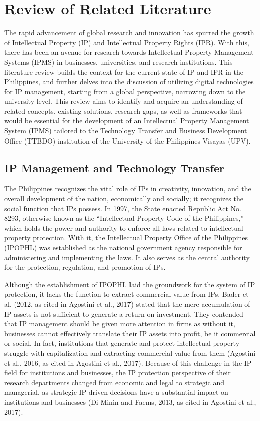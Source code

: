 \chapter{Review of Related Literature}

The rapid advancement of global research and innovation has spurred the growth of Intellectual Property (IP) and Intellectual Property Rights (IPR). With this, there has been an avenue for research towards Intellectual Property Management Systems (IPMS) in businesses, universities, and research institutions. This literature review builds the context for the current state of IP and IPR in the Philippines, and further delves into the discussion of utilizing digital technologies for IP management, starting from a global perspective, narrowing down to the university level. This review aims to identify and acquire an understanding of related concepts, existing solutions, research gaps, as well as frameworks that would be essential for the development of an Intellectual Property Management System (IPMS) tailored to the Technology Transfer and Business Development Office (TTBDO) institution of the University of the Philippines Visayas (UPV).

\section{IP Management and Technology Transfer}

The Philippines recognizes the vital role of IPs in creativity, innovation, and the overall development of the nation, economically and socially; it recognizes the social function that IPs possess. In 1997, the State enacted Republic Act No. 8293, otherwise known as the ``Intellectual Property Code of the Philippines,'' which holds the power and authority to enforce all laws related to intellectual property protection. With it, the Intellectual Property Office of the Philippines (IPOPHL) was established as the national government agency responsible for administering and implementing the laws. It also serves as the central authority for the protection, regulation, and promotion of IPs.

Although the establishment of IPOPHL laid the groundwork for the system of IP protection, it lacks the function to extract commercial value from IPs. 
Bader et al. (2012, as cited in Agostini et al., 2017) stated that the mere accumulation of IP assets is not sufficient to generate a return on investment. They contended that IP management should be given more attention in firms as without it, businesses cannot effectively translate their IP assets into profit, be it commercial or social.
In fact, institutions that generate and protect intellectual property struggle with capitalization and extracting commercial value from them (Agostini et al., 2016, as cited in Agostini et al., 2017). Because of this challenge in the IP field for institutions and businesses, the IP protection perspective of their research departments changed from economic and legal to strategic and managerial, as strategic IP-driven decisions have a substantial impact on institutions and businesses (Di Minin and Faems, 2013, as cited in Agostini et al., 2017).

